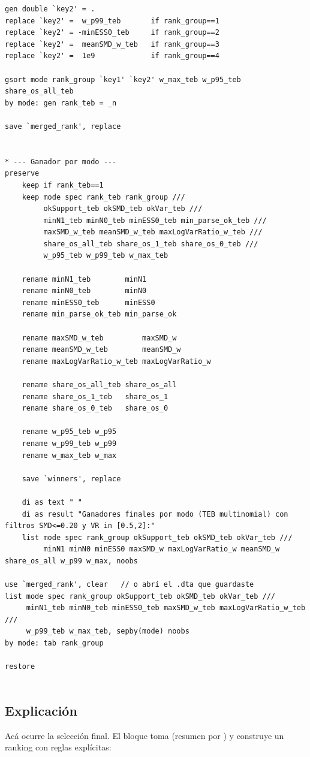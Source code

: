 \documentclass[12pt]{article}
\newcommand{\ttt}[1]{\texttt{\detokenize{#1}}}
\begin{document}
\begin{lstlisting}
gen double `key2' = .
replace `key2' =  w_p99_teb       if rank_group==1
replace `key2' = -minESS0_teb     if rank_group==2
replace `key2' =  meanSMD_w_teb   if rank_group==3
replace `key2' =  1e9             if rank_group==4

gsort mode rank_group `key1' `key2' w_max_teb w_p95_teb share_os_all_teb
by mode: gen rank_teb = _n

save `merged_rank', replace


* --- Ganador por modo ---
preserve
    keep if rank_teb==1
    keep mode spec rank_teb rank_group ///
         okSupport_teb okSMD_teb okVar_teb ///
         minN1_teb minN0_teb minESS0_teb min_parse_ok_teb ///
         maxSMD_w_teb meanSMD_w_teb maxLogVarRatio_w_teb ///
         share_os_all_teb share_os_1_teb share_os_0_teb ///
         w_p95_teb w_p99_teb w_max_teb

    rename minN1_teb        minN1
    rename minN0_teb        minN0
    rename minESS0_teb      minESS0
    rename min_parse_ok_teb min_parse_ok

    rename maxSMD_w_teb         maxSMD_w
    rename meanSMD_w_teb        meanSMD_w
    rename maxLogVarRatio_w_teb maxLogVarRatio_w

    rename share_os_all_teb share_os_all
    rename share_os_1_teb   share_os_1
    rename share_os_0_teb   share_os_0

    rename w_p95_teb w_p95
    rename w_p99_teb w_p99
    rename w_max_teb w_max

    save `winners', replace

    di as text " "
    di as result "Ganadores finales por modo (TEB multinomial) con filtros SMD<=0.20 y VR in [0.5,2]:"
    list mode spec rank_group okSupport_teb okSMD_teb okVar_teb ///
         minN1 minN0 minESS0 maxSMD_w maxLogVarRatio_w meanSMD_w share_os_all w_p99 w_max, noobs

use `merged_rank', clear   // o abrí el .dta que guardaste
list mode spec rank_group okSupport_teb okSMD_teb okVar_teb ///
     minN1_teb minN0_teb minESS0_teb maxSMD_w_teb maxLogVarRatio_w_teb ///
     w_p99_teb w_max_teb, sepby(mode) noobs
by mode: tab rank_group

restore


\end{lstlisting}
\subsection*{Explicación}
Acá ocurre la selección final. El bloque toma \ttt{design_summary_teb} (resumen por \ttt{(modo, spec)}) y construye un ranking con reglas explícitas:
\end{document}
